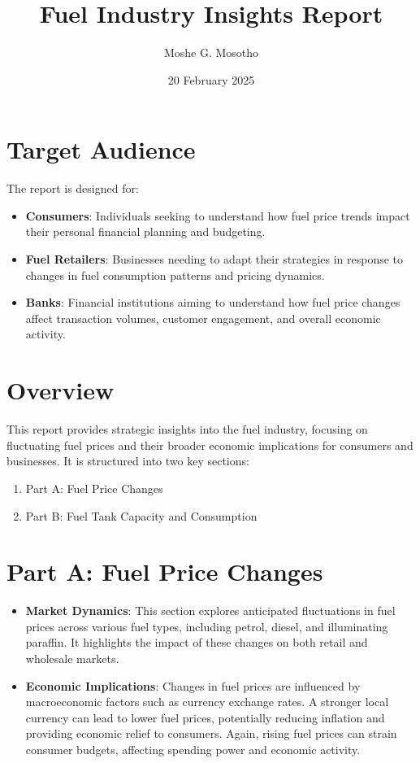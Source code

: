 \documentclass{article}
\title{Fuel Industry Insights Report}
\author{Moshe G. Mosotho}
\date{20 February 2025}
\begin{document}
	
	\maketitle
	
	\vspace{60pt}
	
	\section*{Target Audience}
	The report is designed for:
	\begin{itemize}
		\item \textbf{Consumers}: Individuals seeking to understand how fuel price trends impact their personal financial planning and budgeting.
		\item \textbf{Fuel Retailers}: Businesses needing to adapt their strategies in response to changes in fuel consumption patterns and pricing dynamics.
		\item \textbf{Banks}: Financial institutions aiming to understand how fuel price changes affect transaction volumes, customer engagement, and overall economic activity.
	\end{itemize}
	
	\newpage
	
	\section*{Overview}
	This report provides strategic insights into the fuel industry, focusing on fluctuating fuel prices and their broader economic implications for consumers and businesses. It is structured into two key sections:
	
	\begin{enumerate}
		\item Part A: Fuel Price Changes
		\item Part B: Fuel Tank Capacity and Consumption
	\end{enumerate}
	
	\section*{Part A: Fuel Price Changes}
	\begin{itemize}
		\item \textbf{Market Dynamics}: This section explores anticipated fluctuations in fuel prices across various fuel types, including petrol, diesel, and illuminating paraffin. It highlights the impact of these changes on both retail and wholesale markets.
		\item \textbf{Economic Implications}: Changes in fuel prices are influenced by macroeconomic factors such as currency exchange rates. A stronger local currency can lead to lower fuel prices, potentially reducing inflation and providing economic relief to consumers. Again, rising fuel prices can strain consumer budgets, affecting spending power and economic activity.
	\end{itemize}
	
\end{document}

